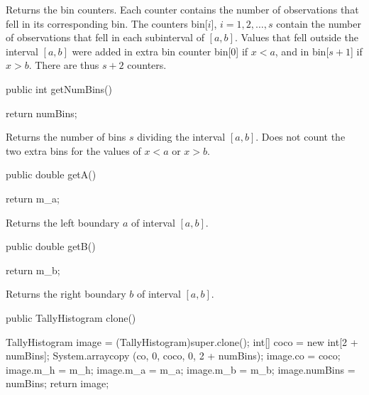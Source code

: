 \begin{tabb} Returns the bin counters. Each counter contains the number of
observations that fell in its corresponding bin.
The counters bin[$i$], $i=1, 2, \ldots, s$ contain the number of observations
that fell in each subinterval of $[a,b]$. Values that fell outside the interval
$[a,b]$ were added in extra bin counter bin[0] if $x < a$, and in bin[$s+1$]
if $x > b$. There are thus $s+2$ counters.
\end{tabb}
\begin{htmlonly}
\end{htmlonly}
\begin{code}

   public int getNumBins() \begin{hide} {
      return numBins;
   }\end{hide}
\end{code}
\begin{tabb} Returns the number of bins $s$ dividing the interval $[a,b]$.
Does not count the two extra bins for the values of $x<a$ or $x>b$.
\end{tabb}
\begin{htmlonly}
\end{htmlonly}
\begin{code}

   public double getA() \begin{hide} {
      return m_a;
   }\end{hide}
\end{code}
\begin{tabb}  Returns the left boundary $a$ of interval $[a,b]$.
\end{tabb}
\begin{htmlonly}
\end{htmlonly}
\begin{code}

   public double getB() \begin{hide} {
      return m_b;
   }\end{hide}
\end{code}
\begin{tabb}  Returns the right boundary $b$ of interval $[a,b]$.
\end{tabb}
\begin{htmlonly}
\end{htmlonly}
\begin{code}

   public TallyHistogram clone()\begin{hide} {
      TallyHistogram image = (TallyHistogram)super.clone();
      int[] coco = new int[2 + numBins];
      System.arraycopy (co, 0, coco, 0, 2 + numBins);
      image.co = coco;
      image.m_h = m_h;
      image.m_a = m_a;
      image.m_b = m_b;
      image.numBins = numBins;
      return image;
   }\end{hide}
\end{code}
